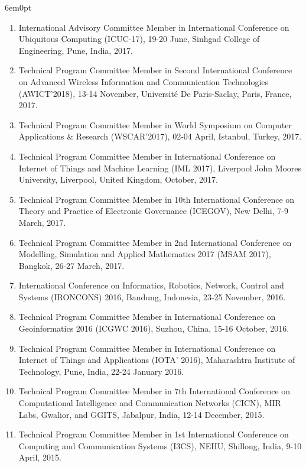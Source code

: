 \documentclass[11pt,a4paper]{moderncv}
\begin{document}
\begin{adjustwidth}{6em}{0pt}
\begin{enumerate}
		\item International Advisory Committee Member in International Conference on Ubiquitous Computing (ICUC-17), 19-20 June, Sinhgad College of Engineering, Pune, India, 2017.
		
		\item Technical Program Committee Member in Second International Conference on Advanced Wireless Information and Communication Technologies (AWICT’2018), 13-14 November, Université De Paris-Saclay, Paris, France, 2017.
		
		\item Technical Program Committee Member in World Symposium on Computer Applications \& Research (WSCAR’2017), 02-04 April, Istanbul, Turkey, 2017.
		
		\item Technical Program Committee Member in International Conference on Internet of Things and Machine Learning (IML 2017), Liverpool John Moores University, Liverpool, United Kingdom, October, 2017.
		
		\item Technical Program Committee Member in 10th International Conference on Theory and Practice of Electronic Governance (ICEGOV), New Delhi, 7-9 March, 2017.
		
		\item Technical Program Committee Member in 2nd International Conference on Modelling, Simulation and Applied Mathematics 2017 (MSAM 2017), Bangkok, 26-27 March, 2017.
		
		\item International Conference on Informatics, Robotics, Network, Control and Systems (IRONCONS) 2016, Bandung, Indonesia, 23-25 November, 2016.
		
		\item Technical Program Committee Member in International Conference on Geoinformatics 2016 (ICGWC 2016), Suzhou, China, 15-16 October, 2016.
		
		\item Technical Program Committee Member in International Conference on Internet of Things and Applications (IOTA' 2016), Maharashtra Institute of Technology, Pune, India, 22-24 January 2016.
		
		\item Technical Program Committee Member in 7th International Conference on Computational Intelligence and Communication Networks (CICN), MIR Labs, Gwalior, and GGITS, Jabalpur, India, 12-14 December, 2015.
		
		\item Technical Program Committee Member in 1st International Conference on Computing and Communication Systems (I3CS), NEHU, Shillong, India, 9-10 April, 2015.
		
		
		
	\end{enumerate}
\end{adjustwidth}
\end{document}

